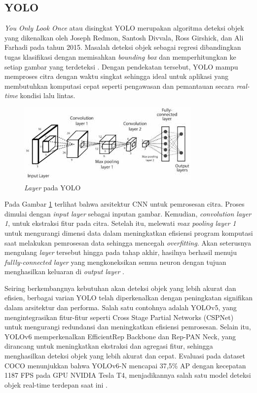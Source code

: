 \subsection{YOLO}
\emph{You Only Look Once} atau disingkat YOLO merupakan algoritma deteksi objek yang dikenalkan oleh Joseph Redmon, Santosh Divvala, Ross Girshick, dan Ali Farhadi pada tahun 2015. Masalah deteksi objek sebagai regresi dibandingkan tugas klasifikasi dengan memisahkan \emph{bounding box} dan memperhitungkan ke setiap gambar yang terdeteksi \cite{yoloweb}. Dengan pendekatan tersebut, YOLO mampu memproses citra dengan waktu singkat sehingga ideal untuk aplikasi yang membutuhkan komputasi cepat seperti pengawasan dan pemantauan secara \emph{real-time} kondisi lalu lintas.

\begin{figure} [H] \centering
  \includegraphics[scale=0.8]{bab2/yolo.jpeg}
  \caption{\emph{Layer} pada YOLO \cite{sohel2021music}}
  \label{fig:layeryolo}
\end{figure}

Pada Gambar \ref{fig:layeryolo} terlihat bahwa arsitektur CNN untuk pemrosesan citra. Proses dimulai dengan \emph{input layer} sebagai inputan gambar. Kemudian, \emph{convolution layer 1}, untuk ekstraksi fitur pada citra. Setelah itu, melewati \emph{max pooling layer 1} untuk mengurangi dimensi data dalam meningkatkan efisiensi program komputasi saat melakukan pemrosesan data sehingga mencegah \emph{overfitting}. Akan seterusnya mengulang \emph{layer} tersebut hingga pada tahap akhir, hasilnya berhasil menuju \emph{fullly-connected layer} yang mengkoneksikan semua neuron dengan tujuan menghasilkan keluaran di \emph{output layer} \cite{layercnn}.

Seiring berkembangnya kebutuhan akan deteksi objek yang lebih akurat dan efisien, berbagai varian YOLO telah diperkenalkan dengan peningkatan signifikan dalam arsitektur dan performa. Salah satu contohnya adalah YOLOv5, yang mengintegrasikan fitur-fitur seperti Cross Stage Partial Networks (CSPNet) untuk mengurangi redundansi dan meningkatkan efisiensi pemrosesan. Selain itu, YOLOv6 memperkenalkan EfficientRep Backbone dan Rep-PAN Neck, yang dirancang untuk meningkatkan ekstraksi dan agregasi fitur, sehingga menghasilkan deteksi objek yang lebih akurat dan cepat. Evaluasi pada dataset COCO menunjukkan bahwa YOLOv6-N mencapai 37,5\% AP dengan kecepatan 1187 FPS pada GPU NVIDIA Tesla T4, menjadikannya salah satu model deteksi objek real-time terdepan saat ini \cite{li2024yolov6}.

